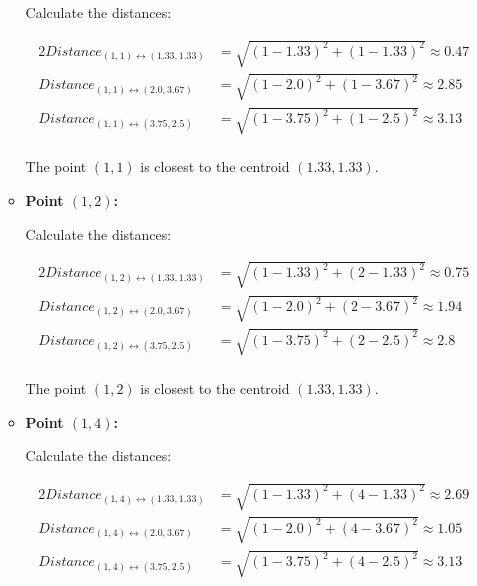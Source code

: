 \documentclass[
english,
smallborders
]{i6prcsht}
\begin{document}
\begin{solution}
\begin{enumerate}
\begin{itemize}
			            Calculate the distances:

			            \begin{alignat*}{2}
				            Distance_{(1,1)\leftrightarrow(1.33,1.33)} & = \sqrt{(1-1.33)^2+(1-1.33)^2} \approx 0.47 \\
				            Distance_{(1,1)\leftrightarrow(2.0,3.67)}  & = \sqrt{(1-2.0)^2+(1-3.67)^2} \approx 2.85  \\
				            Distance_{(1,1)\leftrightarrow(3.75,2.5)}  & = \sqrt{(1-3.75)^2+(1-2.5)^2} \approx 3.13  \\
			            \end{alignat*}

			            The point $(1,1)$ is closest to the centroid $(1.33,1.33)$.

			      \item \textbf{Point $(1,2)$:}

			            Calculate the distances:

			            \begin{alignat*}{2}
				            Distance_{(1,2)\leftrightarrow(1.33,1.33)} & = \sqrt{(1-1.33)^2+(2-1.33)^2} \approx 0.75 \\
				            Distance_{(1,2)\leftrightarrow(2.0,3.67)}  & = \sqrt{(1-2.0)^2+(2-3.67)^2} \approx 1.94  \\
				            Distance_{(1,2)\leftrightarrow(3.75,2.5)}  & = \sqrt{(1-3.75)^2+(2-2.5)^2} \approx 2.8   \\
			            \end{alignat*}

			            The point $(1,2)$ is closest to the centroid $(1.33,1.33)$.

			      \item \textbf{Point $(1,4)$:}

			            Calculate the distances:

			            \begin{alignat*}{2}
				            Distance_{(1,4)\leftrightarrow(1.33,1.33)} & = \sqrt{(1-1.33)^2+(4-1.33)^2} \approx 2.69 \\
				            Distance_{(1,4)\leftrightarrow(2.0,3.67)}  & = \sqrt{(1-2.0)^2+(4-3.67)^2} \approx 1.05  \\
				            Distance_{(1,4)\leftrightarrow(3.75,2.5)}  & = \sqrt{(1-3.75)^2+(4-2.5)^2} \approx 3.13  \\
			            \end{alignat*}


\end{itemize}
\end{enumerate}
\end{solution}
\end{document}
